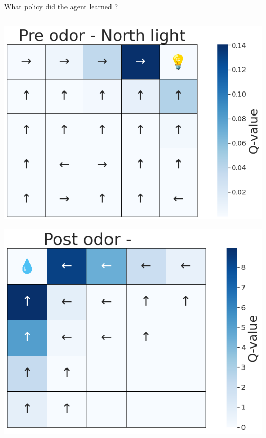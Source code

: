 \documentclass[bigger]{beamer}
\begin{document}
\begin{frame}[label={sec:orgd3d4019}]{What policy did the agent learned ?}
\addtocounter{framenumber}{-1}
\begin{columns}
\begin{column}[t]{0.5\columnwidth}
\begin{center}
\includegraphics[height=0.4\textheight]{img/policy-allo-north-light.png}
\end{center}
\begin{center}
\includegraphics[height=0.4\textheight]{img/policy-allo-odor-A.png}
\end{center}
\end{column}

\end{columns}
\end{frame}
\end{document}
